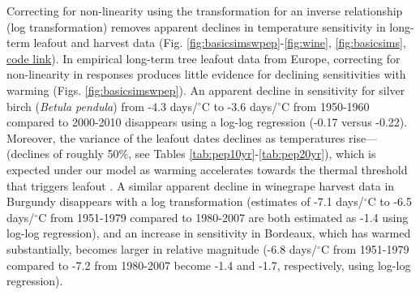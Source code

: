 \documentclass[11pt,letter]{article}
\begin{document}
Correcting for non-linearity using the transformation for an inverse relationship (log transformation) removes apparent declines in temperature sensitivity in long-term leafout and harvest data (Fig. \ref{fig:basicsimswpep}-\ref{fig:wine}, \ref{fig:basicsims}, \href{https://github.com/temporalecologylab/labgit/tree/master/projects/decsenspost}{code link}). In empirical long-term tree leafout data from Europe, correcting for non-linearity in responses produces little evidence for declining sensitivities with warming (Figs. \ref{fig:basicsimswpep}). An apparent decline in sensitivity for silver birch (\emph{Betula pendula}) from -4.3 days/$^{\circ}$C to -3.6 days/$^{\circ}$C from 1950-1960 compared to 2000-2010 disappears using a log-log regression (-0.17 versus -0.22). Moreover, the variance of the leafout dates declines as temperatures rise---(declines of roughly 50\%, see Tables \ref{tab:pep10yr}-\ref{tab:pep20yr}), which is expected under our model as warming accelerates towards the thermal threshold that triggers leafout \citep[and in contrast to predictions from changing mechanisms, see][]{ford2016}. A similar apparent decline in winegrape harvest data in Burgundy disappears with a log transformation (estimates of -7.1 days/$^{\circ}$C to -6.5 days/$^{\circ}$C from 1951-1979 compared to 1980-2007 are both estimated as -1.4 using log-log regression), and an increase in sensitivity in Bordeaux, which has warmed substantially, becomes larger in relative magnitude (-6.8 days/$^{\circ}$C from 1951-1979 compared to -7.2 from 1980-2007 become -1.4 and -1.7, respectively, using log-log regression). \\
\end{document}
